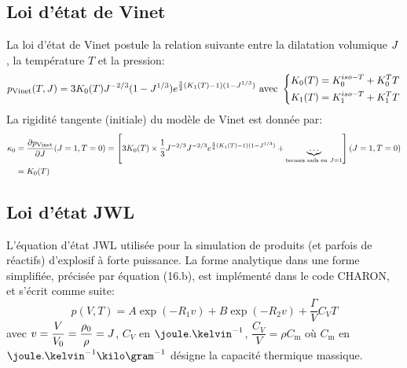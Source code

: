 \documentclass[10pt]{book}
\newcommand{\Cm}{C_{\mathrm{m}}}
\begin{document}
\subsection{Loi d'état de Vinet}
La loi d'état de Vinet \cite{vinet1987temperature} postule la relation suivante entre la dilatation volumique $J$, la température $T$ et la pression:
\begin{equation}
p_{\mathrm{Vinet}}(T,J)=3K_{0}(T)J^{-2/3}(1-J^{1/3})e^{\frac{3}{2}(K_{1}(T)-1)(1-J^{1/3})} \text{ avec } \left\lbrace
\begin{aligned}
K_{0}(T)&=K_{0}^{iso-T}+K_{0}^{T}T\\
K_{1}(T)&=K_{1}^{iso-T}+K_{1}^{T}T
\end{aligned}\right. 
\label{eq:eos_Vinet}
\end{equation}
La rigidité tangente (initiale) du modèle de Vinet est donnée par:
$$\begin{aligned}
\kappa_{0} &= \dfrac{\partial p_{\mathrm{Vinet}}}{\partial J}(J=1, T=0)=\left[3K_{0}(T)\times \dfrac{1}{3}J^{-2/3}J^{-2/3}e^{\frac{3}{2}(K_{1}(T)-1)(1-J^{1/3})}+\underbrace{\dots}_{\text{termes nuls en }J=1}\right](J=1,T=0)\\
&=K_{0}(T)
\end{aligned}$$
\newcommand{\Gruneisen}{\Gamma}
\subsection{Loi d'état JWL}
L'équation d'état JWL utilisée pour la simulation de produits (et parfois de réactifs) d'explosif à forte puissance. La forme analytique dans une forme simplifiée, précisée par \cite{menikoff2015jwl} équation (16.b), est implémenté dans le code CHARON, et s'écrit comme suite:
$$p(V,T) = A \exp(-R_1 v) + B \exp(-R_2 v) +\dfrac{\Gruneisen }{V}C_{V}T$$
avec $v=\dfrac{V}{V_{0}}=\dfrac{\rho_{0}}{\rho}=J$, $C_{V}$ en $\joule.\kelvin^{-1}$, $\dfrac{C_{V}}{V}=\rho \Cm$ où $\Cm$ en $\joule.\kelvin^{-1}\kilo\gram^{-1}$ désigne la capacité thermique massique.
\end{document}
